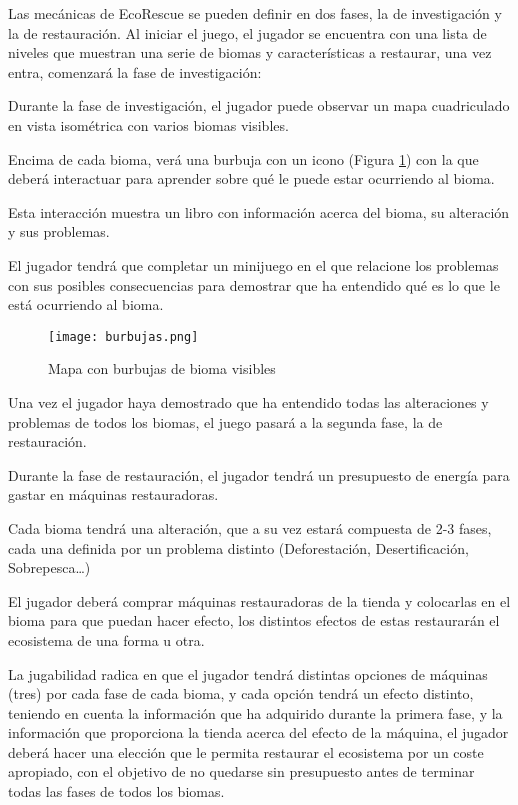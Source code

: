 Las mecánicas de EcoRescue se pueden definir en dos fases, la de investigación y la de restauración. Al iniciar el juego, el jugador se encuentra con una lista de niveles que muestran una serie de biomas y características a restaurar, una vez entra, comenzará la fase de investigación:
\begin{compactitem}
    \item Durante la fase de investigación, el jugador puede observar un mapa cuadriculado en vista isométrica con varios biomas visibles.
    \item Encima de cada bioma, verá una burbuja con un icono (Figura \ref{fig:burbujas}) con la que deberá interactuar para aprender sobre qué le puede estar ocurriendo al bioma.
    \item Esta interacción muestra un libro con información acerca del bioma, su alteración y sus problemas.
    \item El jugador tendrá que completar un minijuego en el que relacione los problemas con sus posibles consecuencias para demostrar que ha entendido qué es lo que le está ocurriendo al bioma.
\end{compactitem}
\begin{figure}[H]
  \centering
	\texttt{[image: burbujas.png]}
  \caption{Mapa con burbujas de bioma visibles}
  \label{fig:burbujas}
\end{figure}
\newpage

Una vez el jugador haya demostrado que ha entendido todas las alteraciones y problemas de todos los biomas, el juego pasará a la segunda fase, la de restauración.
\begin{compactitem}
    \item Durante la fase de restauración, el jugador tendrá un presupuesto de energía para gastar en máquinas restauradoras.
    \item Cada bioma tendrá una alteración, que a su vez estará compuesta de 2-3 fases, cada una definida por un problema distinto (Deforestación, Desertificación, Sobrepesca…)
    \item El jugador deberá comprar máquinas restauradoras de la tienda y colocarlas en el bioma para que puedan hacer efecto, los distintos efectos de estas restaurarán el ecosistema de una forma u otra.
    \item La jugabilidad radica en que el jugador tendrá distintas opciones de máquinas (tres) por cada fase de cada bioma, y cada opción tendrá un efecto distinto, teniendo en cuenta la información que ha adquirido durante la primera fase, y la información que proporciona la tienda acerca del efecto de la máquina, el jugador deberá hacer una elección que le permita restaurar el ecosistema por un coste apropiado, con el objetivo de no quedarse sin presupuesto antes de terminar todas las fases de todos los biomas.
\end{compactitem}

